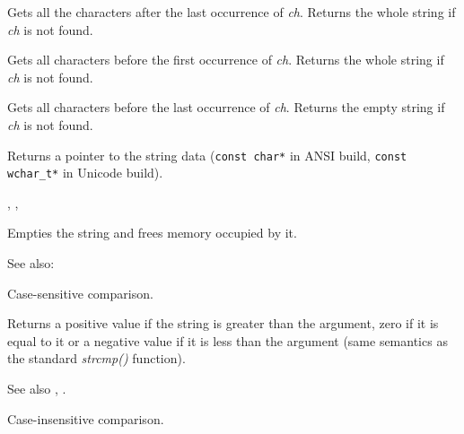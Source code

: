 Gets all the characters after the last occurrence of {\it ch}.
Returns the whole string if {\it ch} is not found.

\label{wxstringbeforefirst}


Gets all characters before the first occurrence of {\it ch}.
Returns the whole string if {\it ch} is not found.

\label{wxstringbeforelast}


Gets all characters before the last occurrence of {\it ch}.
Returns the empty string if {\it ch} is not found.

\label{wxstringcstr}


Returns a pointer to the string data ({\tt const char*} in ANSI build,
{\tt const wchar\_t*} in Unicode build).


, ,

\label{wxstringclear}


Empties the string and frees memory occupied by it.

See also: 

\label{wxstringcmp}


Case-sensitive comparison.

Returns a positive value if the string is greater than the argument, zero if
it is equal to it or a negative value if it is less than the argument (same semantics
as the standard {\it strcmp()} function).

See also , .

\label{wxstringcmpnocase}


Case-insensitive comparison.

